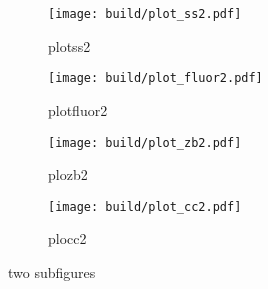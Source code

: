 \begin{figure}[hhh]
  \centering
  \begin{subfigure}{.45\textwidth}
    \centering
    \texttt{[image: build/plot\_ss2.pdf]}
    \caption{plotss2}
    \label{subfig:cool21}
  \end{subfigure}
  \begin{subfigure}{.45\textwidth}
    \centering
    \texttt{[image: build/plot\_fluor2.pdf]}
    \caption{plotfluor2}
    \label{subfig:cool22}
  \end{subfigure}
  \begin{subfigure}{.45\textwidth}
    \centering
    \texttt{[image: build/plot\_zb2.pdf]}
    \caption{plozb2}
    \label{subfig:cool23}
  \end{subfigure}
  \begin{subfigure}{.45\textwidth}
    \centering
    \texttt{[image: build/plot\_cc2.pdf]}
    \caption{plocc2}
    \label{subfig:cool24}
  \end{subfigure}
  \caption{two subfigures}
  \label{fig:very cool2}
\end{figure}
